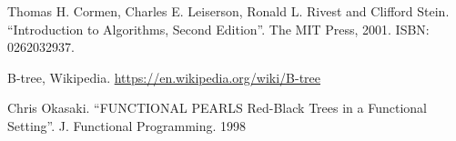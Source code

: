 \documentclass[b5paper]{article}
\begin{document}
\ifx\wholebook\relax \else
\begin{thebibliography}{99}

Thomas H. Cormen, Charles E. Leiserson, Ronald L. Rivest and Clifford Stein. ``Introduction to Algorithms, Second Edition''. The MIT Press, 2001. ISBN: 0262032937.

B-tree, Wikipedia. \url{https://en.wikipedia.org/wiki/B-tree}

Chris Okasaki. ``FUNCTIONAL PEARLS Red-Black Trees in a Functional Setting''. J. Functional Programming. 1998

\end{thebibliography}

\expandafter\enddocument
\fi
\end{document}
